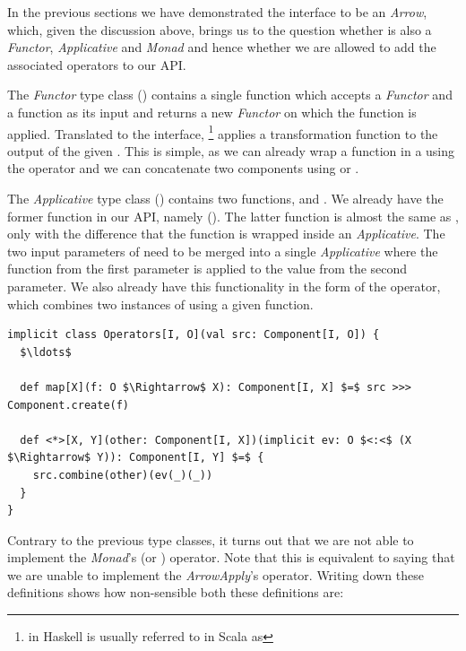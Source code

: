 In the previous sections we have demonstrated the \comp interface to be an \textit{Arrow}, which, given the discussion above, brings us to the question whether \comp is also a \textit{Functor}, \textit{Applicative} and \textit{Monad} and hence whether we are allowed to add the associated operators to our API.

The \textit{Functor} type class () contains a single function  which accepts a \textit{Functor} and a function as its input and returns a new \textit{Functor} on which the function is applied. Translated to the \comp interface, \footnote{ in Haskell is usually referred to in Scala as } applies a transformation function to the output of the given \comp. This is simple, as we can already wrap a function in a \comp using the  operator and we can concatenate two components using  or \code{(>>>)}.

The \textit{Applicative} type class () contains two functions,  and \code{(<*>)}. We already have the former function in our API, namely  (). The latter function is almost the same as , only with the difference that the function is wrapped inside an \textit{Applicative}. The two input parameters of \code{(<*>)} need to be merged into a single \textit{Applicative} where the function from the first parameter is applied to the value from the second parameter. We also already have this functionality in the form of the  operator, which combines two instances of \comp using a given function.

\begin{minipage}{\linewidth}
\begin{lstlisting}[style=ScalaStyle, caption={\textit{Functor} and \textit{Applicative} operators}, label={lst:functor-and-applicative}]
implicit class Operators[I, O](val src: Component[I, O]) {
  $\ldots$

  def map[X](f: O $\Rightarrow$ X): Component[I, X] $=$ src >>> Component.create(f)
  
  def <*>[X, Y](other: Component[I, X])(implicit ev: O $<:<$ (X $\Rightarrow$ Y)): Component[I, Y] $=$ {
    src.combine(other)(ev(_)(_))
  }
}
\end{lstlisting}
\end{minipage}

Contrary to the previous type classes, it turns out that we are not able to implement the \textit{Monad}'s \code{(>>=)} (or ) operator. Note that this is equivalent to saying that we are unable to implement the \textit{ArrowApply}'s  operator. Writing down these definitions shows how non-sensible both these definitions are:


